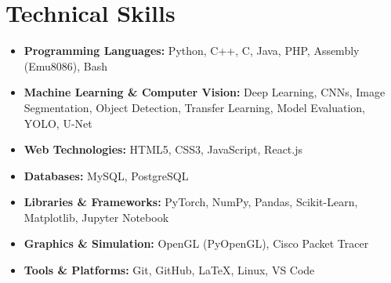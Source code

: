\documentclass[a4paper,11pt]{article}
\begin{document}
\section*{Technical Skills}
\begin{itemize}[leftmargin=1.2em, labelsep=0.4em, itemsep=2pt, parsep=0pt, topsep=3pt]
    \item \textbf{Programming Languages:} Python, C++, C, Java, PHP, Assembly (Emu8086), Bash
    \item \textbf{Machine Learning \& Computer Vision:} Deep Learning, CNNs, Image Segmentation, Object Detection, Transfer Learning, Model Evaluation, YOLO, U-Net
    \item \textbf{Web Technologies:} HTML5, CSS3, JavaScript, React.js
    \item \textbf{Databases:} MySQL, PostgreSQL
    \item \textbf{Libraries \& Frameworks:} PyTorch, NumPy, Pandas, Scikit-Learn, Matplotlib, Jupyter Notebook
    \item \textbf{Graphics \& Simulation:} OpenGL (PyOpenGL), Cisco Packet Tracer
    \item \textbf{Tools \& Platforms:} Git, GitHub, LaTeX, Linux, VS Code
\end{itemize}

\end{document}
